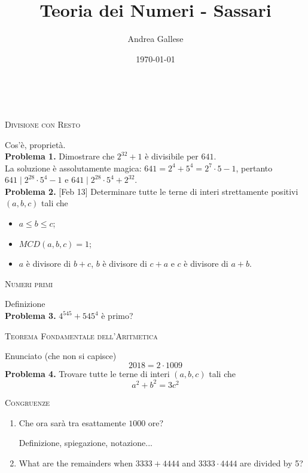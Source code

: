 \documentclass[a4paper]{article}
\title{Teoria dei Numeri - Sassari}\let\Title\@title
\author{Andrea Gallese}\let\Author\@author
\date{\today}\let\Date\@date
\newcommand{\Intitola}{\begin{center}
		\vspace*{0,5 cm}
		{\Huge \textsc{\Title}} \\
		\vspace{0,5 cm}
		\textsc{\Author} \hspace{1cm} \textsc{\Date}
		\thispagestyle{empty}
		\vspace{0,7 cm}
\end{center}}
\theoremstyle{remark}
\theoremstyle{definition}
\begin{document}
\Intitola
\small

\begin{multicols}{2}


\begin{center}
	\textsc{Divisione con Resto}
\end{center}

\textsf{Cos'è, proprietà.}\\

\textbf{Problema 1.} Dimostrare che $2^{32 }+1 $ è divisibile per $ 641 $.\\

\textsf{La soluzione è assolutamente magica: $ 641 = 2^4 + 5^4 = 2^7 \cdot 5 -1 $, pertanto $ 641 \mid 2^{28}\cdot 5^4 - 1 $ e $ 641 \mid  2^{28}\cdot 5^4 + 2^{32} $.}\\

\textbf{Problema 2.} [Feb 13] Determinare tutte le terne di interi strettamente positivi $ (a, b, c) $ tali che
\begin{itemize}
	\item  $ a \leq b \leq c $;
	\item  $ MCD (a, b, c) = 1 $;
	\item  $ a $ è divisore di $ b + c $, $ b $ è divisore di $ c + a $ e $ c $ è divisore di $ a + b $.
\end{itemize}
  
  
\begin{center}
	\textsc{Numeri primi}
\end{center}
\textsf{Definizione}\\

\textbf{Problema 3.} $ 4^{545} + 545^4 $ è primo?

\begin{center}
	\textsc{Teorema Fondamentale dell'Aritmetica}
\end{center}
\textsf{Enunciato (che non si capisce)}
$$  \boxed{2018 = 2 \cdot 1009}  $$
\textbf{Problema 4.} Trovare tutte le terne di interi $ (a, b, c) $ tali che $$  a^2 + b^2 = 3c^2  $$ 
\columnbreak

\begin{center}
	\textsc{Congruenze}
\end{center}
\begin{enumerate}
	\item  Che ora sarà tra esattamente $ 1000 $ ore?
	
	\textsf{Definizione, spiegazione, notazione...}
	
	\item What are the remainders when $ 3333 + 4444 $ and $ 3333 \cdot 4444 $ are divided by 5?
	

\end{enumerate}
\end{multicols}
\end{document}
